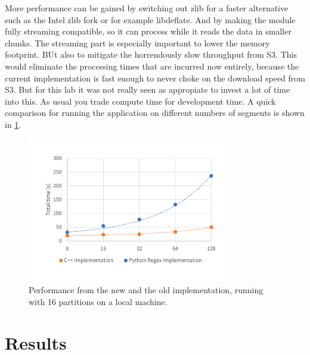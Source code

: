 \documentclass{article}
\begin{document}
More performance can be gained by switching out zlib for a faster alternative such as the Intel zlib fork or for example libdeflate.
And by making the module fully streaming compatible, so it can process while it reads the data in smaller chunks.
The streaming part is especially important to lower the memory footprint.
BUt also to mitigate the horrendously slow throughput from S3.
This would eliminate the processing times that are incurred now entirely, because the current implementation is fast enough to never choke on the download speed from S3.
But for this lab it was not really seen as appropiate to invest a lot of time into this.
As usual you trade compute time for development time.
A quick comparison for running the application on different numbers of segments is shown in \cref{fig:impl-scaling}.

\begin{figure}[H]
    \centering
    \includegraphics[width=0.8\textwidth]{resource/impl-scaling.pdf}
    \caption{Performance from the new and the old implementation, running with 16 partitions on a local machine.}
    \label{fig:impl-scaling}
\end{figure}

\section{Results}


\printbibliography
\end{document}
